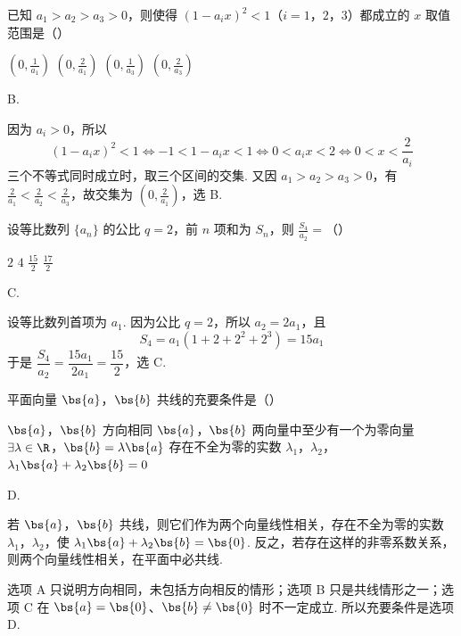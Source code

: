 \begin{problem}
已知 \(a_{1} > a_{2} > a_{3} > 0\)，则使得 \((1 - a_i x)^2 < 1\)（\(i = 1\)，\(2\)，\(3\)）都成立的 \(x\) 取值范围是（\quad）

\choices
    {\(\left(0, \frac{1}{a_1}\right)\)}
    {\(\left(0, \frac{2}{a_1}\right)\)}
    {\(\left(0, \frac{1}{a_3}\right)\)}
    {\(\left(0, \frac{2}{a_3}\right)\)}
\end{problem}

\begin{answer}
B.
\end{answer}

\begin{solution}
因为 \(a_i>0\)，所以
\[
(1-a_i x)^2<1\iff -1<1-a_i x<1\iff 0<a_i x<2\iff 0<x<\frac{2}{a_i}
\]
三个不等式同时成立时，取三个区间的交集. 又因 \(a_1>a_2>a_3>0\)，有 \(\frac{2}{a_1}<\frac{2}{a_2}<\frac{2}{a_3}\)，故交集为 \(\left(0,\frac{2}{a_1}\right)\)，选 B.
\end{solution}

\begin{problem}
设等比数列 \(\{a_{n}\}\) 的公比 \(q = 2\)，前 \(n\) 项和为 \(S_{n}\)，则 \(\frac{S_4}{a_2} =\)（\quad）

\choices
    {\(2\)}
    {\(4\)}
    {\( \frac{15}{2} \)}
    {\(\frac{17}{2}\)}
\end{problem}

\begin{answer}
C.
\end{answer}

\begin{solution}
设等比数列首项为 \(a_1\). 因为公比 \(q=2\)，所以 \(a_2=2a_1\)，且
\[
S_4=a_1(1+2+2^2+2^3)=15a_1
\]
于是 \(\dfrac{S_4}{a_2}=\dfrac{15a_1}{2a_1}=\dfrac{15}{2}\)，选 C.
\end{solution}

\begin{problem}
平面向量 \(\bs{a}\)，\(\bs{b}\) 共线的充要条件是（\quad）

\choices
    {\(\bs{a}\)，\(\bs{b}\) 方向相同}
    {\(\bs{a}\)，\(\bs{b}\) 两向量中至少有一个为零向量}
    {\(\exists \lambda \in \R\)，\(\bs{b} = \lambda \bs{a}\)}
    {存在不全为零的实数 \(\lambda_{1}\)，\(\lambda_{2}\)，\(\lambda_{1} \bs{a} + \lambda_{2} \bs{b} = 0\)}
\end{problem}

\begin{answer}
D.
\end{answer}

\begin{solution}
若 \(\bs{a}\)，\(\bs{b}\) 共线，则它们作为两个向量线性相关，存在不全为零的实数 \(\lambda_1\)，\(\lambda_2\)，使 \(\lambda_1\bs{a}+\lambda_2\bs{b}=\bs{0}\). 反之，若存在这样的非零系数关系，则两个向量线性相关，在平面中必共线.

选项 A 只说明方向相同，未包括方向相反的情形；选项 B 只是共线情形之一；选项 C 在 \(\bs{a}=\bs{0}\)、\(\bs{b}\ne\bs{0}\) 时不一定成立. 所以充要条件是选项 D.
\end{solution}

